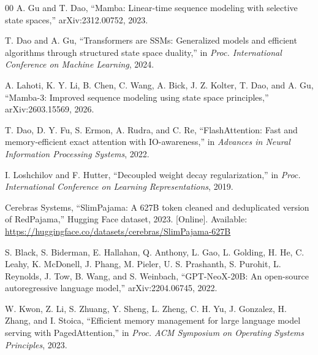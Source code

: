 \documentclass[conference]{IEEEtran}
\begin{document}
\begin{thebibliography}{00}
A. Gu and T. Dao, ``Mamba: Linear-time sequence modeling with selective state spaces,'' arXiv:2312.00752, 2023.

T. Dao and A. Gu, ``Transformers are SSMs: Generalized models and efficient algorithms through structured state space duality,'' in \textit{Proc. International Conference on Machine Learning}, 2024.

A. Lahoti, K. Y. Li, B. Chen, C. Wang, A. Bick, J. Z. Kolter, T. Dao, and A. Gu, ``Mamba-3: Improved sequence modeling using state space principles,'' arXiv:2603.15569, 2026.

T. Dao, D. Y. Fu, S. Ermon, A. Rudra, and C. Re, ``FlashAttention: Fast and memory-efficient exact attention with IO-awareness,'' in \textit{Advances in Neural Information Processing Systems}, 2022.

I. Loshchilov and F. Hutter, ``Decoupled weight decay regularization,'' in \textit{Proc. International Conference on Learning Representations}, 2019.

Cerebras Systems, ``SlimPajama: A 627B token cleaned and deduplicated version of RedPajama,'' Hugging Face dataset, 2023. [Online]. Available: \url{https://huggingface.co/datasets/cerebras/SlimPajama-627B}

S. Black, S. Biderman, E. Hallahan, Q. Anthony, L. Gao, L. Golding, H. He, C. Leahy, K. McDonell, J. Phang, M. Pieler, U. S. Prashanth, S. Purohit, L. Reynolds, J. Tow, B. Wang, and S. Weinbach, ``GPT-NeoX-20B: An open-source autoregressive language model,'' arXiv:2204.06745, 2022.

W. Kwon, Z. Li, S. Zhuang, Y. Sheng, L. Zheng, C. H. Yu, J. Gonzalez, H. Zhang, and I. Stoica, ``Efficient memory management for large language model serving with PagedAttention,'' in \textit{Proc. ACM Symposium on Operating Systems Principles}, 2023.
\end{thebibliography}
\end{document}
